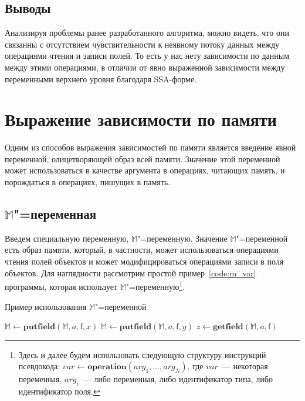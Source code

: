 \documentclass[14pt,titlepage,draft]{extarticle}
\newcommand{\M}{\ensuremath{\mathbb{M}}}
\newcommand{\field}[1]{\mathrm{#1}}
\newcommand{\op}[1]{\mathbf{#1}}
\begin{document}
    \subsection{Выводы}

      Анализируя проблемы ранее разработанного алгоритма, можно видеть, что они
      связанны с отсутствием чувствительности к неявному потоку данных между
      операциями чтения и записи полей. То есть у нас нету зависимости по
      данным между этими операциями, в отличии от явно выраженной зависимости
      между переменными верхнего уровня благодаря SSA-форме. 

  \section{Выражение зависимости по памяти}

    Одним из способов выражения зависимостей по памяти является введение
    явной переменной, олицетворяющей образ всей памяти. Значение этой
    переменной может использоваться в качестве аргумента в операциях, читающих
    память, и порождаться в операциях, пишущих в память.

    \subsection{\texorpdfstring{\M}{M}"=переменная}

      Введем специальную переменную, \M"=переменную. Значение \M"=переменной
      есть образ памяти, который, в частности, может использоваться операциями
      чтения полей объектов и может модифицироваться операциями записи в поля
      объектов. Для наглядности рассмотрим простой пример~\ref{code:m_var}
      программы, которая использует \M"=переменную\footnote{
        Здесь и далее будем использовать следующую структуру инструкций
        псевдокода: $var \gets \op{operation}(arg_1, \ldots, arg_N)$, где
        $var$~--- некоторая переменная, $arg_i$~--- либо переменная, либо
        идентификатор типа, либо идентификатор поля.}.

      \begin{algorithm}
        \caption{Пример использования \M"=переменной}
        \label{code:m_var}
        \begin{algorithmic}[1]
          \If{\ldots}
            \State $\M \gets \op{putfield}(\M, a, \field{f}, x)$
          \Else
            \State $\M \gets \op{putfield}(\M, a, \field{f}, y)$
          \EndIf
          \State $z \gets \op{getfield}(\M, a, \field{f})$
        \end{algorithmic}
      \end{algorithm}
\end{document}
